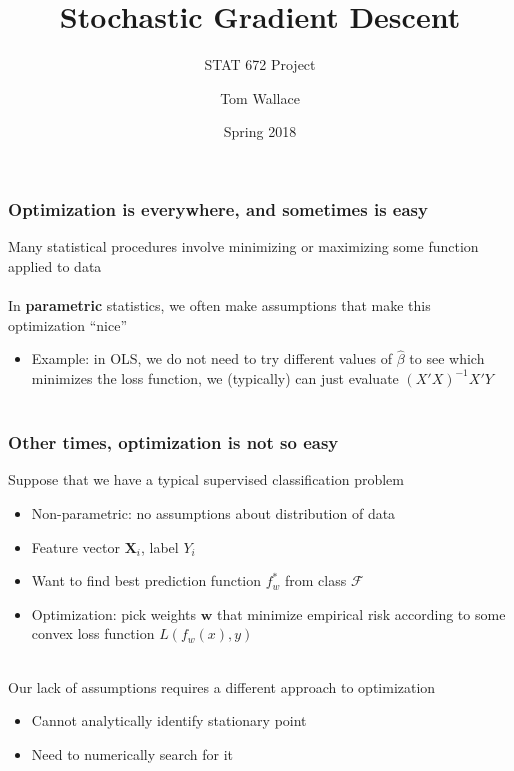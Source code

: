 \documentclass{beamer}
\title{Stochastic Gradient Descent}
\subtitle{STAT 672 Project}
\author{Tom Wallace}
\institute{George Mason University}
\date{Spring 2018}
\begin{document}
\frame{\titlepage}


\begin{frame}
	\frametitle{Optimization is everywhere, and sometimes is easy}
	Many statistical procedures involve minimizing or maximizing some function 
	applied to data \\~\\

	In \textbf{parametric} statistics, we often make assumptions that make this optimization ``nice''
	\begin{itemize}
		\item \small Example: in OLS, we do not need to try
			different values
			of $\hat{\beta}$ to see which minimizes the loss
			function, we (typically) can just evaluate
			$(X'X)^{-1}X'Y$ \\~\\
	\end{itemize}
	\smallskip

	\centering
\end{frame}

\begin{frame}
	\frametitle{Other times, optimization is not so easy}
	Suppose that we have a typical supervised classification problem
	\begin{itemize}
		\item \small Non-parametric: no assumptions about distribution of data
		\item Feature vector $\mathbf{X}_i$, label $Y_i$
		\item Want to find best prediction function $f_w^*$ from class $\mathcal{F}$
		\item Optimization: pick weights $\bm{w}$ that minimize
			empirical risk according to some convex
			loss function $L(f_w(x), y)$ \\~\\
	\end{itemize}

	Our lack of assumptions requires a different approach to optimization
	\begin{itemize}
		\item \small Cannot analytically identify stationary point
		\item Need to numerically search for it
	\end{itemize}
\end{frame}
\end{document}
